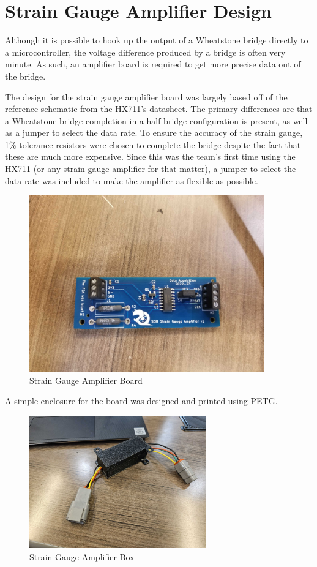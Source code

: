 \section{Strain Gauge Amplifier Design}
Although it is possible to hook up the output of a Wheatstone bridge directly to a microcontroller, the voltage difference produced by a bridge is often very minute.
As such, an amplifier board is required to get more precise data out of the bridge.
\vspace{1em}

The design for the strain gauge amplifier board was largely based off of the reference schematic from the HX711's datasheet.
The primary differences are that a Wheatstone bridge completion in a half bridge configuration is present, as well as a jumper to select the data rate.
To ensure the accuracy of the strain gauge, 1\% tolerance resistors were chosen to complete the bridge despite the fact that these are much more expensive.
Since this was the team's first time using the HX711 (or any strain gauge amplifier for that matter), a jumper to select the data rate was included to make the amplifier as flexible as possible.
\begin{figure}[H]
    \centering
    \includegraphics[width=4in]{images/sgamplifier-assembled.jpg}
    \caption{Strain Gauge Amplifier Board}
    \label{fig:sgb}
\end{figure}
A simple enclosure for the board was designed and printed using PETG.
\begin{figure}[H]
    \centering
    \includegraphics[width=3in]{images/sg-box.jpg}
    \caption{Strain Gauge Amplifier Box}
    \label{fig:sgxb}
\end{figure}

